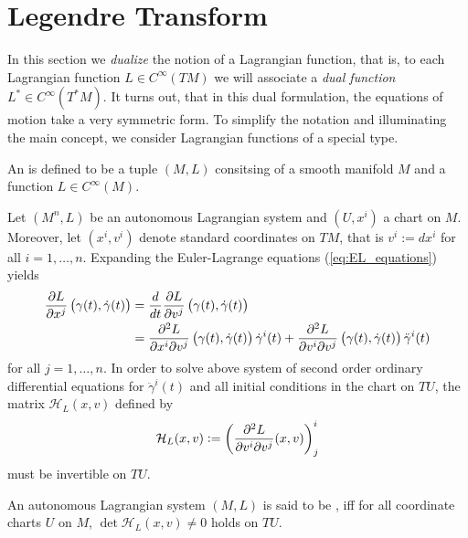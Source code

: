 \section*{Legendre Transform}
In this section we \emph{dualize} the notion of a Lagrangian function, that is, to each Lagrangian function $L \in C^\infty(TM)$ we will associate a \emph{dual function} $L^* \in C^\infty(T^*M)$. It turns out, that in this dual formulation, the equations of motion take a very symmetric form. To simplify the notation and illuminating the main concept, we consider Lagrangian functions of a special type.

\begin{definition}
	An  is defined to be a tuple $(M,L)$ consitsing of a smooth manifold $M$ and a function $L \in C^\infty(M)$.
\end{definition}

Let $(M^n,L)$ be an autonomous Lagrangian system and $(U,x^i)$ a chart on $M$. Moreover, let $(x^i,v^i)$ denote standard coordinates on $TM$, that is $v^i := dx^i$ for all $i = 1,\dots,n$. Expanding the Euler-Lagrange equations (\ref{eq:EL_equations}) yields
\begin{align*}
	\frac{\partial L}{\partial x^j}\del[1]{\gamma(t),\dot{\gamma}(t)} &= \frac{d}{dt}\frac{\partial L}{\partial v^j}\del[1]{\gamma(t),\dot{\gamma}(t)}\\
	&= \frac{\partial^2 L}{\partial x^i\partial v^j}\del[1]{\gamma(t),\dot{\gamma}(t)}\dot{\gamma}^i(t) + \frac{\partial^2 L}{\partial v^i\partial v^j}\del[1]{\gamma(t),\dot{\gamma}(t)}\ddot{\gamma}^i(t)
\end{align*}
\noindent for all $j = 1,\dots,n$. In order to solve above system of second order ordinary differential equations for $\ddot{\gamma}^i(t)$ and all initial conditions in the chart on $TU$, the matrix $\mathcal{H}_L(x,v)$ defined by
\begin{equation}
	\label{eq:H_L}
	\mathcal{H}_L(x,v) := \del[3]{\frac{\partial^2 L}{\partial v^i\partial v^j}(x,v)}_j^i
\end{equation}
\noindent must be invertible on $TU$.

\begin{definition}
	An autonomous Lagrangian system $(M,L)$ is said to be , iff for all coordinate charts $U$ on $M$, $\det \mathcal{H}_L(x,v) \neq 0$ holds on $TU$. 
\end{definition}

